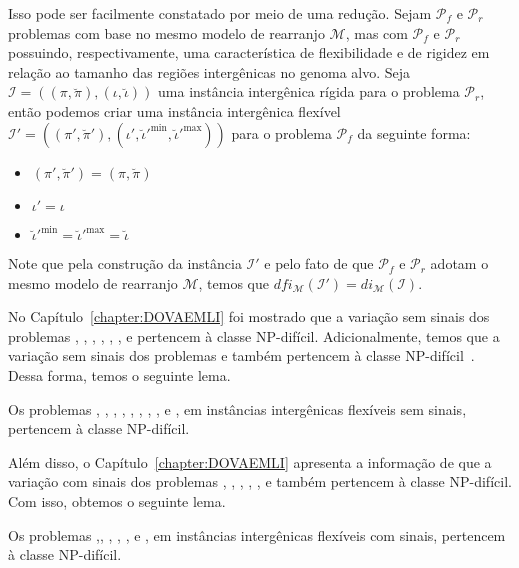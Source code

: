 Isso pode ser facilmente constatado por meio de uma redução. Sejam $\mathcal{P}_f$ e $\mathcal{P}_r$ problemas com base no mesmo modelo de rearranjo $\mathcal{M}$, mas com $\mathcal{P}_f$ e $\mathcal{P}_r$ possuindo, respectivamente, uma característica de flexibilidade e de rigidez em relação ao tamanho das regiões intergênicas no genoma alvo. Seja $\mathcal{I}=((\pi,\breve\pi),(\iota,\breve\iota))$ uma instância intergênica rígida para o problema $\mathcal{P}_r$, então podemos criar uma instância intergênica flexível $\mathcal{I'} = ((\pi',\breve\pi'),(\iota',\breve\iota'^{\min},\breve\iota'^{\max}))$ para o problema $\mathcal{P}_f$ da seguinte forma:

\begin{itemize}
  \item $(\pi',\breve\pi') = (\pi,\breve\pi)$
  \item $\iota' = \iota$
  \item $\breve\iota'^{\min} = \breve\iota'^{\max} = \breve\iota$
\end{itemize}

Note que pela construção da instância $\mathcal{I'}$ e pelo fato de que $\mathcal{P}_f$ e $\mathcal{P}_r$ adotam o mesmo modelo de rearranjo $\mathcal{M}$, temos que $dfi_{\mathcal{M}}(\mathcal{I'}) = di_{\mathcal{M}}(\mathcal{I})$.

No Capítulo~\ref{chapter:DOVAEMLI} foi mostrado que a variação sem sinais dos problemas \SbIR{}, \SbIRI{}, \SbIRM{}, \SbIRMI{}, \SbIRT{}, \SbIRTI{}, \SbIRTM{} e \SbIRTMI{} pertencem à classe NP-difícil. Adicionalmente, temos que a variação sem sinais dos problemas \SbIT{} e \SbITM{} também pertencem à classe NP-difícil~\cite{2021a-oliveira-etal}. Dessa forma, temos o seguinte lema.

\begin{lemma}\label{lemma:BEBGUYUB}
Os problemas \SbFIR{}, \SbFIRI{}, \SbFIRM{}, \SbFIRMI{}, \SbFIRT{}, \SbFIRTI{}, \SbFIRTM{}, \SbFIRTMI{}, \SbFIT{} e \SbFITM{}, em instâncias intergênicas flexíveis sem sinais, pertencem à classe NP-difícil.
\end{lemma}

Além disso, o Capítulo~\ref{chapter:DOVAEMLI} apresenta a informação de que a variação com sinais dos problemas \SbIR{}, \SbIRM{}, \SbIRMI{}, \SbIRT{}, \SbIRTI{}, \SbIRTM{} e \SbIRTMI{} também pertencem à classe NP-difícil. Com isso, obtemos o seguinte lema.

\begin{lemma}\label{lemma:XPRZJZES}
Os problemas \SbFIR{},\SbFIRM{}, \SbFIRMI{}, \SbFIRT{}, \SbFIRTI{}, \SbFIRTM{} e \SbFIRTMI{}, em instâncias intergênicas flexíveis com sinais, pertencem à classe NP-difícil.
\end{lemma}

